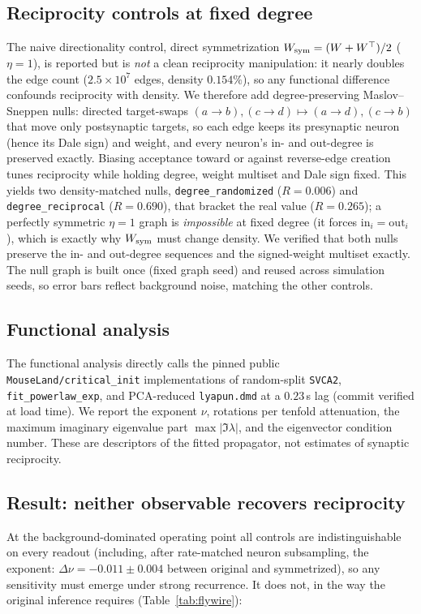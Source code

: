 \documentclass[11pt]{article}
\begin{document}
\subsection{Reciprocity controls at fixed degree}
The naive directionality control, direct symmetrization
$W_{\rm sym}=(W+W^\top)/2$ ($\eta=1$), is reported but is \emph{not} a clean
reciprocity manipulation: it nearly doubles the edge count
($2.5\times10^{7}$ edges, density $0.154\%$), so any functional difference
confounds reciprocity with density. We therefore add degree-preserving
Maslov--Sneppen nulls\cite{maslov2002}: directed target-swaps
$(a\!\to\!b),(c\!\to\!d)\mapsto(a\!\to\!d),(c\!\to\!b)$ that move only
postsynaptic targets, so each edge keeps its presynaptic neuron (hence its Dale
sign) and weight, and every neuron's in- and out-degree is preserved exactly.
Biasing acceptance toward or against reverse-edge creation tunes reciprocity
while holding degree, weight multiset and Dale sign fixed. This yields two
density-matched nulls, \texttt{degree\_randomized} ($R=0.006$) and
\texttt{degree\_reciprocal} ($R=0.690$), that bracket the real value
($R=0.265$); a perfectly symmetric $\eta=1$ graph is \emph{impossible} at fixed
degree (it forces $\mathrm{in}_i=\mathrm{out}_i$), which is exactly why
$W_{\rm sym}$ must change density. We verified that both nulls preserve the in-
and out-degree sequences and the signed-weight multiset exactly. The null graph
is built once (fixed graph seed) and reused across simulation seeds, so error
bars reflect background noise, matching the other controls.

\subsection{Functional analysis}
The functional analysis directly calls the pinned public
\texttt{MouseLand/critical\_init} implementations of random-split
\texttt{SVCA2}, \texttt{fit\_powerlaw\_exp}, and PCA-reduced \texttt{lyapun.dmd}
at a $0.23$\,s lag (commit verified at load time). We report the exponent $\nu$,
rotations per tenfold attenuation, the maximum imaginary eigenvalue part
$\max|\Im\lambda|$, and the eigenvector condition number. These are descriptors
of the fitted propagator, not estimates of synaptic reciprocity.

\subsection{Result: neither observable recovers reciprocity}
At the background-dominated operating point all controls are indistinguishable
on every readout (including, after rate-matched neuron subsampling, the exponent:
$\Delta\nu=-0.011\pm0.004$ between original and symmetrized), so any sensitivity
must emerge under strong recurrence. It does not, in the way the original
inference requires (Table~\ref{tab:flywire}):
\end{document}

